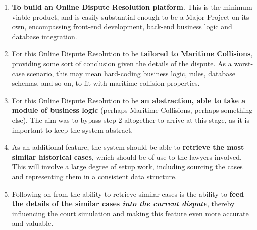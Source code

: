 \begin{enumerate}

    \item \textbf{To build an Online Dispute Resolution platform}. This is the minimum viable product, and is easily substantial enough to be a Major Project on its own, encompassing front-end development, back-end business logic and database integration.

    \item For this Online Dispute Resolution to be \textbf{tailored to Maritime Collisions}, providing some sort of conclusion given the details of the dispute. As a worst-case scenario, this may mean hard-coding business logic, rules, database schemas, and so on, to fit with maritime collision properties.

    \item For this Online Dispute Resolution to be \textbf{an abstraction, able to take a module of business logic} (perhaps Maritime Collisions, perhaps something else). The aim was to bypass step 2 altogether to arrive at this stage, as it is important to keep the system abstract.

    \item As an additional feature, the system should be able to \textbf{retrieve the most similar historical cases}, which should be of use to the lawyers involved. This will involve a large degree of setup work, including sourcing the cases and representing them in a consistent data structure.

    \item Following on from the ability to retrieve similar cases is the ability to \textbf{feed the details of the similar cases \emph{into the current dispute}}, thereby influencing the court simulation and making this feature even more accurate and valuable.

\end{enumerate}